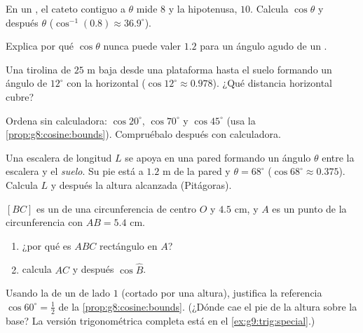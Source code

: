 \begin{exercise}[$\star$]\label{exo:g8:cosine:5}
En un , el cateto contiguo a $\theta$ mide $8$ y
la hipotenusa, $10$. Calcula $\cos\theta$ y después $\theta$
($\cos^{-1}(0.8) \approx 36.9^\circ$).
\end{exercise}

\begin{exercise}[$\star$]\label{exo:g8:cosine:6}
Explica por qué $\cos\theta$ nunca puede valer $1.2$ para un ángulo agudo
de un .
\end{exercise}

\begin{exercise}[$\star\star$]\label{exo:g8:cosine:7}
Una tirolina de $25$ m baja desde una plataforma hasta el suelo formando un
ángulo de $12^\circ$ con la horizontal ($\cos 12^\circ \approx
0.978$). ¿Qué distancia horizontal cubre?
\end{exercise}

\begin{exercise}[$\star\star$]\label{exo:g8:cosine:8}
Ordena sin calculadora: $\cos 20^\circ$, $\cos 70^\circ$ y
$\cos 45^\circ$ (usa la \cref{prop:g8:cosine:bounds}). Compruébalo después con
calculadora.
\end{exercise}

\begin{exercise}[$\star\star$]\label{exo:g8:cosine:9}
Una escalera de longitud $L$ se apoya en una pared formando un ángulo $\theta$
entre la escalera y el \emph{suelo}. Su pie está a $1.2$ m de la pared
y $\theta = 68^\circ$ ($\cos 68^\circ \approx 0.375$). Calcula $L$
y después la altura alcanzada (Pitágoras).
\end{exercise}

\begin{exercise}[$\star\star$]\label{exo:g8:cosine:10}
$[BC]$ es un  de una circunferencia de centro $O$ y  $4.5$ cm,
y $A$ es un punto de la circunferencia con $AB = 5.4$ cm.
\begin{enumerate}
  \item ¿por qué es $ABC$ rectángulo en $A$?
  \item calcula $AC$ y después $\cos \widehat B$.
\end{enumerate}
\end{exercise}

\begin{exercise}[$\star\star\star$]\label{exo:g8:cosine:11}
Usando la  de un  de lado $1$ (cortado por una altura),
justifica la referencia $\cos 60^\circ = \frac12$ de la
\cref{prop:g8:cosine:bounds}. (¿Dónde cae el pie de la altura
sobre la base? La versión trigonométrica completa está en el
\cref{ex:g9:trig:special}.)
\end{exercise}

